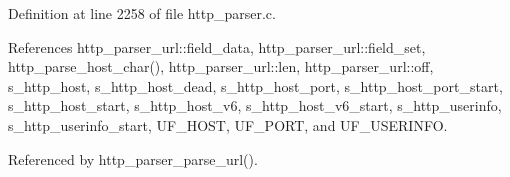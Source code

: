 Definition at line 2258 of file http\+\_\+parser.\+c.



References http\+\_\+parser\+\_\+url\+::field\+\_\+data, http\+\_\+parser\+\_\+url\+::field\+\_\+set, http\+\_\+parse\+\_\+host\+\_\+char(), http\+\_\+parser\+\_\+url\+::len, http\+\_\+parser\+\_\+url\+::off, s\+\_\+http\+\_\+host, s\+\_\+http\+\_\+host\+\_\+dead, s\+\_\+http\+\_\+host\+\_\+port, s\+\_\+http\+\_\+host\+\_\+port\+\_\+start, s\+\_\+http\+\_\+host\+\_\+start, s\+\_\+http\+\_\+host\+\_\+v6, s\+\_\+http\+\_\+host\+\_\+v6\+\_\+start, s\+\_\+http\+\_\+userinfo, s\+\_\+http\+\_\+userinfo\+\_\+start, U\+F\+\_\+\+H\+O\+ST, U\+F\+\_\+\+P\+O\+RT, and U\+F\+\_\+\+U\+S\+E\+R\+I\+N\+FO.



Referenced by http\+\_\+parser\+\_\+parse\+\_\+url().


